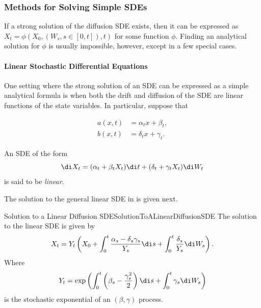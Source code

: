 \subsubsection{Methods for Solving Simple SDEs}

If a strong solution of the \Ito{} diffusion SDE exists, then it can be expressed as \(X_t = \phi(X_0,(W_s, s \in [0,t]), t)\) for some function \(\phi\). Finding an analytical solution for \(\phi\) is usually impossible, however, except in a few special cases.

\paragraph{Linear Stochastic Differential Equations}

One setting where the strong solution of an SDE can be expressed as a simple analytical formula is when both the drift and diffusion of the SDE are linear functions of the state variables. In particular, suppose that

\begin{align*}
	a(x, t) & = \alpha_t x + \beta_t,  \\
	b(x, t) & = \delta_t x + \gamma_t.
\end{align*}

An SDE of the form
\begin{equation}
	\di X_t = (\alpha_t  + \beta_t X_t) \di t + (\delta_t + \gamma_t X_t) \di W_t
	\label{eq:LinearSDE}
\end{equation}
is said to be \textit{linear}.

The solution to the general linear SDE in  is given next.

\begin{prop}{Solution to a Linear Diffusion SDE}{SolutionToALinearDiffusionSDE}
	The solution to the linear SDE  is given by
	\begin{equation}\label{eq:LinearSDESolution}
		X_t
		= Y_t \left(
		X_0
		+ \int_0^t \frac{\alpha_s - \delta_s \gamma_s}{Y_s} \di s
		+ \int_0^t \frac{\delta_s}{Y_s} \di W_s
		\right).
	\end{equation}
	Where
	\begin{equation}\label{eq:LinearSDEIntegratingFactor}
		Y_t
		= \exp \left(
		\int_0^t \left( \beta_s - \frac{\gamma_s^2}{2} \right) \di s
		+ \int_0^t \gamma_s \di W_s
		\right)
	\end{equation}
	is the stochastic exponential of an \Ito$(\beta, \gamma)$ process.
\end{prop}

